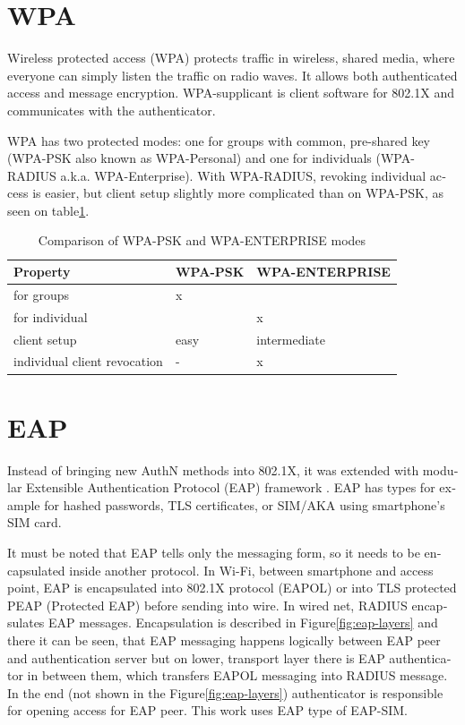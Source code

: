 \documentclass[12pt,a4paper,english]{tutthesis}
\begin{document}
\begin{otherlanguage}{english}
\section{WPA}
\label{sec-2-3}

Wireless protected access (WPA) protects traffic in wireless,
shared media, where everyone can simply listen the traffic on
radio waves. It allows both authenticated access and message
encryption.
WPA-supplicant is client software for 802.1X and communicates with the authenticator.

WPA has two protected modes: one for groups with common, pre-shared
key (WPA-PSK also known as WPA-Personal) and one for individuals
(WPA-RADIUS a.k.a. WPA-Enterprise).  With WPA-RADIUS, revoking
individual access is easier, but client setup slightly more
complicated than on WPA-PSK, as seen on table\ref{psk-enterprise}.

\begin{table}[htb]
\caption{\label{psk-enterprise}Comparison of WPA-PSK and WPA-ENTERPRISE modes}
\centering
\begin{tabular}{lll}
Property & WPA-PSK & WPA-ENTERPRISE\\
\hline
for groups & x & \\
for individual &  & x\\
client setup & easy & intermediate\\
individual client revocation & - & x\\
\hline
\end{tabular}
\end{table}

\section{EAP}
\label{sec-2-4}

Instead of bringing new AuthN methods into 802.1X, it was 
extended with modular Extensible Authentication Protocol (EAP) 
framework \cite{rfc5247}. EAP has types for example for hashed
passwords, TLS certificates, or SIM/AKA using smartphone's SIM card.

It must be noted that EAP tells only the messaging form, so it needs
to be encapsulated inside another protocol.  In Wi-Fi, between
smartphone and access point, EAP is encapsulated into 802.1X protocol
(EAPOL) or into TLS protected PEAP (Protected EAP) \cite{peap} before
sending into wire. In wired net, RADIUS encapsulates EAP
messages. Encapsulation is described in Figure\ref{fig:eap-layers}
and there it can be seen, that 
EAP messaging happens logically between EAP peer and authentication
server but on lower, transport layer there is EAP authenticator in
between them, which transfers EAPOL messaging into RADIUS message.
In the end (not shown in the Figure\ref{fig:eap-layers}) authenticator is
responsible for opening access for EAP peer. This work uses EAP type of EAP-SIM.




\end{otherlanguage}
\end{document}
